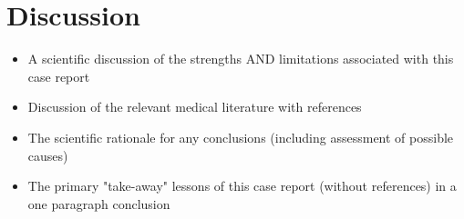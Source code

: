 \section{Discussion}
\begin{itemize}
\item A scientific discussion of the strengths AND limitations associated with this case report
\item Discussion of the relevant medical literature with references
\item The scientific rationale for any conclusions (including assessment of possible causes)
\item The primary "take-away" lessons of this case report (without references) in a one paragraph conclusion


\end{itemize}

